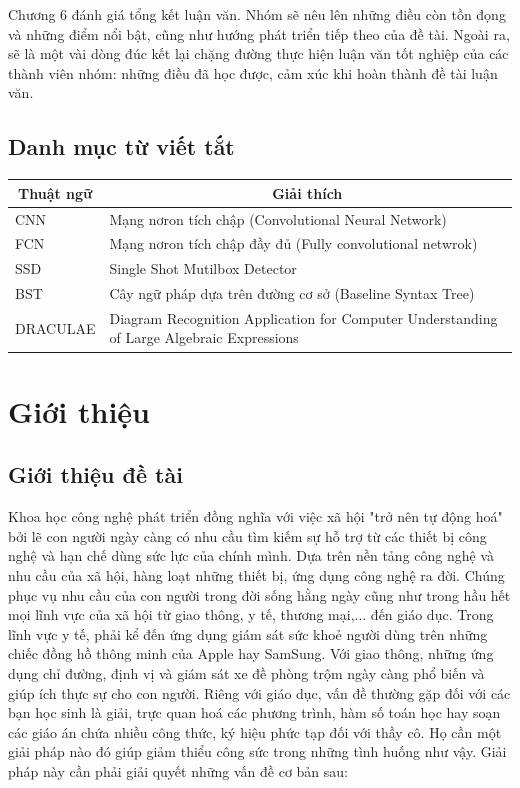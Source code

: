 \documentclass[a4paper,12pt]{article}
\begin{document}
	Chương 6 đánh giá tổng kết luận văn. Nhóm sẽ nêu lên những điều còn tồn đọng và những điểm nổi bật, cũng như hướng phát triển tiếp theo của đề tài. Ngoài ra, sẽ là một vài dòng đúc kết lại chặng đường thực hiện luận văn tốt nghiệp của các thành viên nhóm: những điều đã học được, cảm xúc khi hoàn thành đề tài luận văn.
	\newpage
	\setlength{\cftsecnumwidth}{3cm}
	\tableofcontents
	\newpage
	\listoffigures
	\newpage
	\listoftables
	\newpage
	
	\subsection*{Danh mục từ viết tắt}
	
	
	
	\begin{table} [!htb]
		\centering
		\begin{tabular}{| m{4cm} | m{12cm}|}\hline
			\multicolumn{1}{|c|}{\textbf{Thuật ngữ}} & 
			\multicolumn{1}{|c|}{\textbf{Giải thích}}\\\hline
			CNN & Mạng nơron tích chập (Convolutional Neural Network)\\\hline
			FCN & Mạng nơron tích chập đầy đủ (Fully convolutional netwrok) \\\hline
			SSD & Single Shot Mutilbox Detector\\\hline
			BST & Cây ngữ pháp dựa trên đường cơ sở (Baseline Syntax Tree)\\\hline
			DRACULAE & Diagram Recognition Application for Computer Understanding of Large Algebraic Expressions\\\hline
		\end{tabular}
	\end{table}
	
	\newpage
	\section{Giới thiệu}
	\subsection{Giới thiệu đề tài}
	\label{subsec: introduce}
	Khoa học công nghệ phát triển đồng nghĩa với việc xã hội "trở nên tự động hoá" bởi lẽ con người ngày càng có nhu cầu tìm kiếm sự hỗ trợ từ các thiết bị công nghệ và hạn chế dùng sức lực của chính mình. Dựa trên nền tảng công nghệ và nhu cầu của xã hội, hàng loạt những thiết bị, ứng dụng công nghệ ra đời. Chúng phục vụ nhu cầu của con người trong đời sống hằng ngày cũng như trong hầu hết mọi lĩnh vực của xã hội từ giao thông, y tế, thương mại,... đến giáo dục. Trong lĩnh vực y tế, phải kể đến ứng dụng giám sát sức khoẻ người dùng trên những chiếc đồng hồ thông minh của Apple hay SamSung. Với giao thông, những ứng dụng chỉ đường, định vị và giám sát xe đề phòng trộm ngày càng phổ biến và giúp ích thực sự cho con người. Riêng với giáo dục, vấn đề thường gặp đối với các bạn học sinh là giải, trực quan hoá các phương trình, hàm số toán học hay soạn các giáo án chứa nhiều công thức, ký hiệu phức tạp đối với thầy cô. Họ cần một giải pháp nào đó giúp giảm thiểu công sức trong những tình huống như vậy. Giải pháp này cần phải giải quyết những vấn đề cơ bản sau:
	
\end{document}
